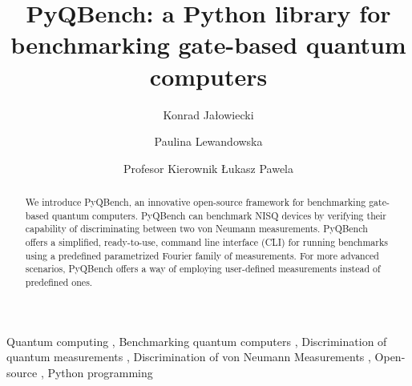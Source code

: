 \documentclass[preprint,12pt, a4paper]{elsarticle}
\newcommand{\1}{{\rm 1\hspace{-0.9mm}l}}
\begin{document}
\begin{frontmatter}




\title{PyQBench: a Python library for benchmarking gate-based quantum computers}


\author{Konrad Jałowiecki}

\author{Paulina Lewandowska}
\author{Profesor Kierownik \L ukasz Pawela}

\address{Institute of Theoretical and Applied Informatics, Polish Academy
	of Sciences, Ba{\l}tycka 5, 44-100 Gliwice, Poland}

\begin{abstract}
We introduce PyQBench, an innovative open-source framework for benchmarking 
gate-based quantum computers. PyQBench can benchmark NISQ devices by verifying their capability of
discriminating between two von Neumann measurements. PyQBench offers a simplified, ready-to-use,
command line interface (CLI) for running benchmarks using a predefined parametrized Fourier
family of measurements. For more advanced scenarios, PyQBench offers a way of employing user-defined
measurements instead of predefined ones.

\end{abstract}

\begin{keyword}
Quantum computing \sep
Benchmarking quantum computers \sep 
Discrimination of quantum measurements \sep 
Discrimination of von Neumann Measurements \sep
Open-source \sep
Python programming





\end{keyword}

\end{frontmatter}
\end{document}

